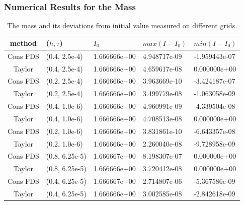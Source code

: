 \documentclass{beamer}
\begin{document}
\begin{frame}
\frametitle{Numerical Results for the Mass}
\begin{table}[ht]
\centering
\small
		\begin{tabular}{||c|l|l|l|l||}
			\hline
method        & ($h,\tau$)& $I_0$ &   $max(I-I_0)$ & $min(I-I_0)$  \\
   			\hline 
Cons FDS            &  (0.4, 2.5e-4) & 1.666666e+00 &  4.948717e-09 & -1.959443e-07                    \\
 Taylor               &  (0.4, 2.5e-4) & 1.666666e+00 &  4.659617e-08 & 0.000000e+00                \\
Cons FDS            &  (0.2, 2.5e-4) & 1.666666e+00 & 3.963669e-10 & -3.424187e-07             \\
 Taylor               &  (0.2, 2.5e-4) & 1.666666e+00 & 3.499779e-08 & -1.063058e-09               \\
	   		\hline
			\hline
Cons FDS             & (0.4, 1.0e-6) & 1.666666e+00 & 4.960991e-09 & -4.339504e-08                    \\
 Taylor                & (0.4, 1.0e-6) & 1.666666e+00 & 4.708513e-08 & 0.000000e+00                   \\
Cons FDS            & (0.2, 1.0e-6) & 1.666666e+00 & 3.831861e-10 & -6.643357e-08                  \\
 Taylor                & (0.2, 1.0e-6) & 1.666666e+00 & 2.260040e-08 & -9.728958e-09                      \\
	   		\hline
			\hline
Cons FDS           &  (0.8, 6.25e-5) & 1.666667e+00 & 8.198307e-07 & 0.000000e+00                    \\
Taylor                &  (0.8, 6.25e-5) & 1.666666e+00 &  3.720412e-08 & 0.000000e+00                      \\
Cons FDS           &  (0.4, 6.25e-5) & 1.666667e+00 &  2.714807e-06 & -5.367586e-09                     \\
Taylor                &  (0.4, 6.25e-5) & 1.666666e+00 &  3.002585e-08 & -2.842618e-09                      \\
			\hline 
			\hline
		\end{tabular}
		\caption{ The mass and its deviations from initial value measured on different grids. }
\label{tableMass}
\end{table}
\end{frame}

\end{document}
